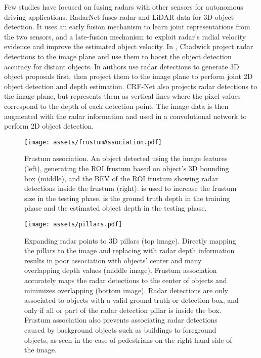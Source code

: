 \documentclass[10pt,twocolumn,letterpaper]{article}
\begin{document}
   Few studies have focused on fusing radars with other sensors
   for autonomous driving applications. RadarNet \cite{yangRadarNetExploitingRadar2020}
   fuses radar and 
   LiDAR data for 3D object detection. It uses an early fusion mechanism to learn 
   joint representations from the two sensors, and a late-fusion mechanism to 
   exploit radar's radial velocity evidence and improve the estimated object velocity.
   In \cite{chadwickDistantVehicleDetection2019}, Chadwick \etal project radar detections to the image plane and use them to 
   boost the object detection accuracy for distant objects. In 
   \cite{nabatiRadarCameraSensorFusion2020} authors use radar detections to 
   generate 3D object proposals first, then project them to the image plane 
   to perform joint 2D object detection and depth estimation. CRF-Net 
   \cite{nobisDeepLearningbasedRadar2019} also projects radar detections to the 
   image plane, but represents them as vertical lines where the pixel values 
   correspond to the depth of each detection point. The image data is then augmented 
   with the radar information and used in a convolutional network to perform 2D object 
   detection.
   
   \begin{figure*}[ht!]
      \texttt{[image: assets/frustumAssociation.pdf]}
      \caption{Frustum association. An object detected using the image 
      features (left), generating the ROI frustum based on object's 3D bounding
      box (middle), and the BEV of the ROI frustum showing radar detections 
      inside the frustum (right).  is used to increase the frustum size 
      in the testing phase.  is the ground truth depth in the training 
      phase and the estimated object depth in the testing phase.}
      \label{fig:frustum}
   \end{figure*}
   
   \begin{figure}[ht!]
      \texttt{[image: assets/pillars.pdf]}
      \caption{Expanding radar points to 3D pillars (top image). 
           Directly mapping the pillars to the image and replacing with 
           radar depth information results in poor association with objects' 
           center and many overlapping depth values (middle image). 
           Frustum association accurately maps the radar detections
           to the center of objects and minimizes overlapping (bottom image).
           Radar detections are only associated to objects with a valid ground 
           truth or detection box, and only if all or part of the radar detection 
           pillar is inside the box. Frustum association also prevents associating 
           radar detections caused by background objects such as buildings to 
           foreground objects, as seen in the case of pedestrians on the right 
           hand side of the image.}
      \label{fig:pillars}
   \end{figure}
   
\end{document}
